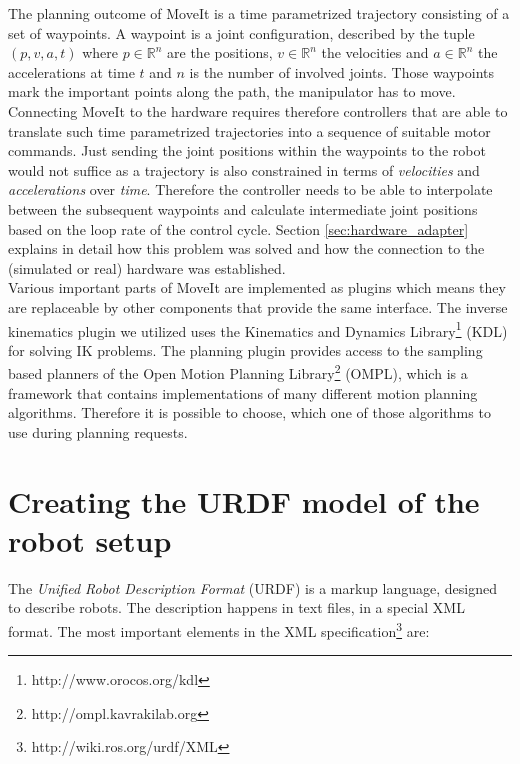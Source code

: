 The planning outcome of MoveIt is a time parametrized trajectory consisting of a set of waypoints. A waypoint is a joint configuration, described by the tuple $(p,v,a,t)$ where $p \in \mathbb{R}^n$ are the positions, $v \in \mathbb{R}^n$ the velocities and $a \in \mathbb{R}^n$ the accelerations at time $t$ and $n$ is the number of involved joints. Those waypoints mark the important points along the path, the manipulator has to move. Connecting  MoveIt to the hardware requires therefore controllers that are able to translate such time parametrized trajectories into a sequence of suitable motor commands. Just sending the joint positions within the waypoints to the robot would not suffice as a trajectory is also constrained in terms of \emph{velocities} and \emph{accelerations} over \emph{time}. Therefore the controller needs to be able to interpolate between the subsequent waypoints and calculate intermediate joint positions based on the loop rate of the control cycle. Section \ref{sec:hardware_adapter} explains in detail how this problem was solved and how the connection to the (simulated or real) hardware was established.\\

Various important parts of MoveIt are implemented as plugins which means they are replaceable by other components that provide the same interface. The inverse kinematics plugin we utilized uses the Kinematics and Dynamics Library\footnote{http://www.orocos.org/kdl} (KDL) for solving IK problems. The planning plugin provides access to the sampling based planners of the  Open Motion Planning Library\footnote{http://ompl.kavrakilab.org} (OMPL), which is a framework that contains implementations of many different motion planning algorithms. Therefore it is possible to choose, which one of those algorithms to use during planning requests. \\

\section{Creating the URDF model of the robot setup}
\label{sec:urdf}

The \emph{Unified Robot Description Format} (URDF) is a markup language, designed to describe robots. The description happens in text files, in a special XML format. The most important elements in the XML specification\footnote{http://wiki.ros.org/urdf/XML} are:

